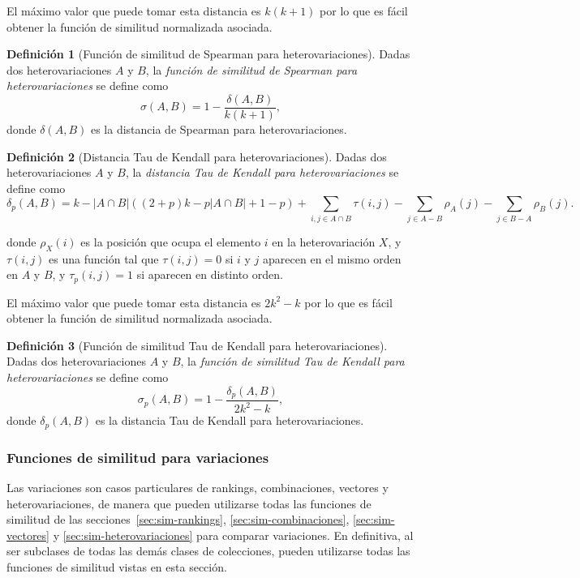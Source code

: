 \documentclass[a4paper,10pt,twoside]{article}
\theoremstyle{definition}
\newtheorem{definition}{Definición}
\begin{document}
El máximo valor que puede tomar esta distancia es $k(k+1)$ por lo que es fácil obtener la función de similitud
normalizada asociada.

\begin{definition}[Función de similitud de Spearman para heterovariaciones]
Dadas dos heterovariaciones $A$ y $B$, la \emph{función de similitud de Spearman para heterovariaciones} se define como
\[
\sigma(A,B) = 1-\frac{\delta(A,B)}{k(k+1)},
\]
donde $\delta(A,B)$ es la distancia de Spearman para heterovariaciones.
\end{definition} 

\begin{definition}[Distancia Tau de Kendall para heterovariaciones]
Dadas dos heterovariaciones $A$ y $B$, la \emph{distancia Tau de Kendall para heterovariaciones} se define como
\[
\delta_p(A,B) = k-|A\cap B|((2+p)k-p|A\cap B|+1-p)+\sum_{i,j\in A\cap B}\tau(i,j)-\sum_{j\in A-B}\rho_A(j)-\sum_{j\in
B-A}\rho_B(j).
\]

donde $\rho_X(i)$ es la posición que ocupa el elemento $i$ en la heterovariación $X$, y $\tau(i,j)$ es una función tal que  $\tau(i,j)=0$ si $i$ y $j$ aparecen en el mismo orden en $A$ y $B$, y $\tau_p(i,j)=1$ si aparecen en distinto orden.
\end{definition}

El máximo valor que puede tomar esta distancia es $2k^2-k$ por lo que es fácil obtener la función de similitud normalizada asociada.

\begin{definition}[Función de similitud Tau de Kendall para heterovariaciones]
Dadas dos heterovariaciones $A$ y $B$, la \emph{función de similitud Tau de Kendall para
heterovariaciones} se define como
\[
\sigma_p(A,B) = 1-\frac{\delta_p(A,B)}{2k^2-k},
\]
donde $\delta_p(A,B)$ es la distancia Tau de Kendall para heterovariaciones.
\end{definition} 


\subsubsection{Funciones de similitud para variaciones}
\label{sec:sim-variaciones}
Las variaciones son casos particulares de rankings, combinaciones, vectores y heterovariaciones, de manera que pueden utilizarse todas
las funciones de similitud de las secciones~\ref{sec:sim-rankings}, \ref{sec:sim-combinaciones}, \ref{sec:sim-vectores} y \ref{sec:sim-heterovariaciones} para comparar variaciones.
En definitiva, al ser subclases de todas las demás clases de colecciones, pueden utilizarse todas las funciones de similitud vistas en esta sección. 
\end{document}

